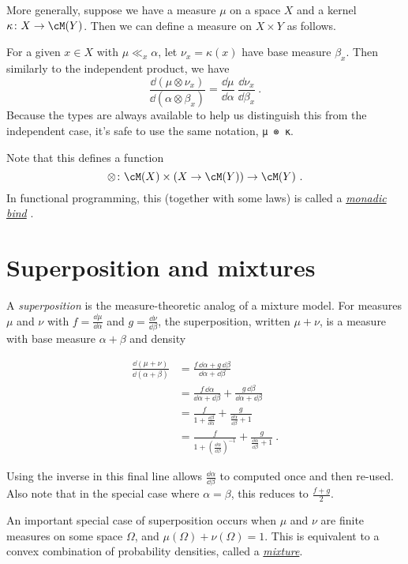 \documentclass{juliacon}
\begin{document}
More generally, suppose we have a measure $\mu$ on a space $X$ and a kernel $\kappa\colon X \to \cM(Y)$. Then we can define a measure on $X \times Y$ as follows.

For a given $x \in X$ with $\mu \ll_x \alpha$, let $\nu_x = \kappa(x)$ have base measure $\beta_x$. Then similarly to the independent product, we have
\[
\frac{\dd(\mu \otimes \nu_x)}{\dd(\alpha \otimes \beta_x)} = \frac{\dd\mu}{\dd\alpha}\ \frac{\dd\nu_x}{\dd\beta_x}\ .
\]
Because the types are always available to help us distinguish this from the independent case, it's safe to use the same notation, \verb|μ ⊗ κ|.

Note that this defines a function
\[
\otimes \colon \cM(X) \times (X \to \cM(Y)) \to \cM(Y)\ .
\]
In functional programming, this (together with some laws) is called a \href{https://en.wikipedia.org/wiki/Monad_(functional_programming)}{\emph{monadic bind}} \cite{ramsey2002stochastic}. 

\section{Superposition and mixtures \label{superposition}}

A \emph{superposition} is the measure-theoretic analog of a mixture model. For measures $\mu$ and $\nu$ with $f=\frac{\dd\mu}{\dd\alpha}$ and $g=\frac{\dd\nu}{\dd\beta}$, the superposition, written $\mu + \nu$, is a measure with base measure $\alpha + \beta$ and density

\[
\begin{aligned}\frac{\dd(\mu+\nu)}{\dd(\alpha+\beta)} & =\frac{f\,\dd\alpha+g\,\dd\beta}{\dd\alpha+\dd\beta}\\
 & =\frac{f\,\dd\alpha}{\dd\alpha+\dd\beta}+\frac{g\,\dd\beta}{\dd\alpha+\dd\beta}\\
 & =\frac{f}{1+\frac{\dd\beta}{\dd\alpha}}+\frac{g}{\frac{\dd\alpha}{\dd\beta}+1}\\
 & =\frac{f}{1+\left(\frac{\dd\alpha}{\dd\beta}\right)^{-1}}+\frac{g}{\frac{\dd\alpha}{\dd\beta}+1}\ .
\end{aligned}
\]

Using the inverse in this final line allows $\frac{\dd\alpha}{\dd\beta}$ to computed once and then re-used. Also note that in the special case where $\alpha=\beta$, this reduces to $\frac{f+g}{2}$.

An important special case of superposition occurs when $\mu$ and $\nu$ are finite measures on some space $\Omega$, and $\mu(\Omega) + \nu(\Omega) = 1$. This is equivalent to a convex combination of probability densities, called a \href{https://en.wikipedia.org/wiki/Mixture_distribution}{\emph{mixture}}.
\end{document}
